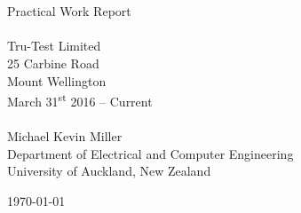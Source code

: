 \begin{titlepage}
\begin{center}

\\~\\\vspace{3cm}
{\huge Practical Work Report}\\[2cm]

\HRule \\[0.5cm]
{\LARGE Tru-Test Limited}\\[0.3cm]
{\large 25 Carbine Road\\
Mount Wellington}\\[0.3cm]
March 31\textsuperscript{st} 2016 -- Current\\[0.3cm]
\HRule \\[2cm]

{\large Michael Kevin Miller}\\[0.5cm]
Department of Electrical and Computer Engineering\\[0.2cm]
University of Auckland, New Zealand

\vfill
{\large \today}

\end{center}
\end{titlepage}
